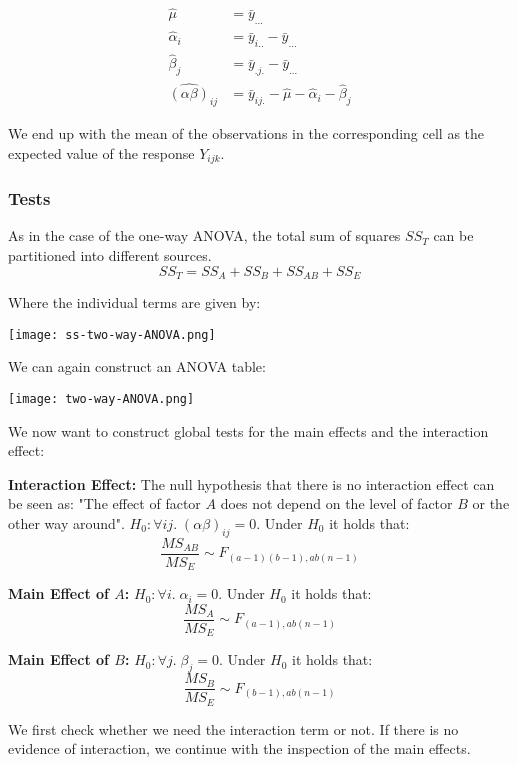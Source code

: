 \begin{align*}
	\hat \mu &= \bar y_{...} \\
	\hat \alpha_i &= \bar y_{i..} - \bar y_{...} \\
	\hat \beta_j &= \bar y_{.j.} - \bar y_{...} \\
	\widehat {(\alpha \beta)}_{ij} &= \bar y_{ij.} - \hat \mu - \hat \alpha_i - \hat \beta_j
\end{align*}

We end up with the mean of the observations in the corresponding cell as the expected value of the response $Y_{ijk}$.

\subsubsection{Tests}

As in the case of the one-way ANOVA, the total sum of squares $SS_T$ can be partitioned into different sources.
$$SS_T = SS_A + SS_B + SS_{AB} + SS_E$$

Where the individual terms are given by:
\begin{center}
	\texttt{[image: ss-two-way-ANOVA.png]}
\end{center}

We can again construct an ANOVA table:

\begin{center}
	\texttt{[image: two-way-ANOVA.png]}
\end{center}

We now want to construct global tests for the main effects and the interaction effect: \medskip

\textbf{Interaction Effect:} The null hypothesis that there is no interaction effect can be seen as: "The effect of factor $A$ does not depend on the level of factor $B$ or the other way around". $H_0: \forall ij. \; (\alpha \beta)_{ij} = 0$. Under $H_0$ it holds that:
$$\frac{MS_{AB}}{MS_E} \sim F_{(a-1)(b-1),ab(n-1)}$$

\textbf{Main Effect of $A$:} $H_0: \forall i. \; \alpha_i = 0$. Under $H_0$ it holds that:
$$\frac{MS_{A}}{MS_E} \sim F_{(a-1), ab(n-1)}$$
 
\textbf{Main Effect of $B$:} $H_0: \forall j. \; \beta_j = 0$. Under $H_0$ it holds that:
$$\frac{MS_{B}}{MS_E} \sim F_{(b-1), ab(n-1)}$$

We first check whether we need the interaction term or not. If there is no evidence of interaction, we continue with the inspection of the main effects.

